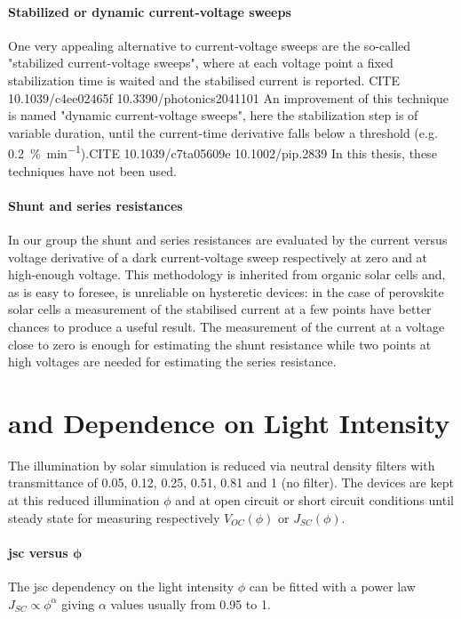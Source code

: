 \paragraph{Stabilized or dynamic current-voltage sweeps}
One very appealing alternative to current-voltage sweeps are the so-called "stabilized current-voltage sweeps", where at each voltage point a fixed stabilization time is waited and the stabilised current is reported. CITE 10.1039/c4ee02465f 10.3390/photonics2041101
An improvement of this technique is named "dynamic current-voltage sweeps", here the stabilization step is of variable duration, until the current-time derivative falls below a threshold (e.g. \SI{0.2}{\%\per\minute}).CITE 10.1039/c7ta05609e 10.1002/pip.2839
In this thesis, these techniques have not been used. 

\paragraph{Shunt and series resistances} \label{resistances} In our group the shunt and series resistances are evaluated by the current versus voltage derivative of a dark current-voltage sweep respectively at zero and at high-enough voltage. This methodology is inherited from organic solar cells and, as is easy to foresee, is unreliable on hysteretic devices: in the case of perovskite solar cells a measurement of the stabilised current at a few points have better chances to produce a useful result. The measurement of the current at a voltage close to zero is enough for estimating the shunt resistance while two points at high voltages are needed for estimating the series resistance.

\section{ and  Dependence on Light Intensity}
The illumination by solar simulation is reduced via neutral density filters with transmittance of 0.05, 0.12, 0.25, 0.51, 0.81 and 1 (no filter). The devices are kept at this reduced illumination $\phi$ and at open circuit or short circuit conditions until steady state for measuring respectively $V_{OC}(\phi)$ or $J_{SC}(\phi)$.

\paragraph{\Gls{jsc} versus $\bm{\phi}$}\label{methods_jsc_intensity} The \gls{jsc} dependency on the light intensity $\phi$ can be fitted with a power law $J_{SC} \propto \phi^\alpha$ giving $\alpha$ values usually from 0.95 to 1.

